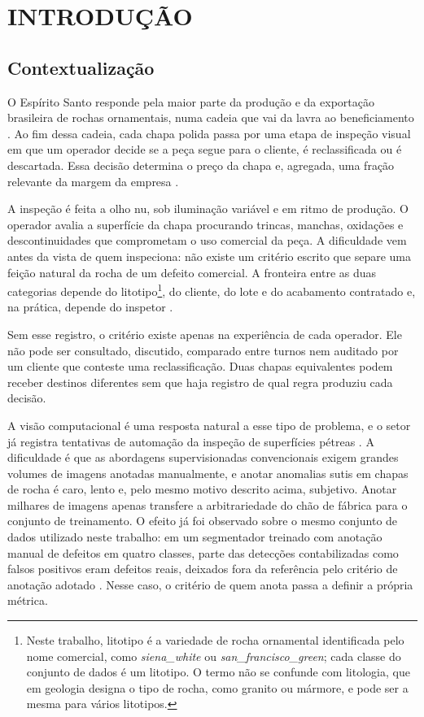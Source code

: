 \chapter[INTRODUÇÃO]{INTRODUÇÃO}

\section{Contextualização}

O Espírito Santo responde pela maior parte da produção e da exportação brasileira de rochas ornamentais, numa cadeia que vai da lavra ao beneficiamento \cite{stone_economy_bahiense2023}. Ao fim dessa cadeia, cada chapa polida passa por uma etapa de inspeção visual em que um operador decide se a peça segue para o cliente, é reclassificada ou é descartada. Essa decisão determina o preço da chapa e, agregada, uma fração relevante da margem da empresa \cite{stone_inspection_vidal2013}.

A inspeção é feita a olho nu, sob iluminação variável e em ritmo de produção. O operador avalia a superfície da chapa procurando trincas, manchas, oxidações e descontinuidades que comprometam o uso comercial da peça. A dificuldade vem antes da vista de quem inspeciona: não existe um critério escrito que separe uma feição natural da rocha de um defeito comercial. A fronteira entre as duas categorias depende do litotipo\footnote{Neste trabalho, litotipo é a variedade de rocha ornamental identificada pelo nome comercial, como \textit{siena\_white} ou \textit{san\_francisco\_green}; cada classe do conjunto de dados é um litotipo. O termo não se confunde com litologia, que em geologia designa o tipo de rocha, como granito ou mármore, e pode ser a mesma para vários litotipos.}, do cliente, do lote e do acabamento contratado e, na prática, depende do inspetor \cite{stone_subjectivity_castro2018}.

Sem esse registro, o critério existe apenas na experiência de cada operador. Ele não pode ser consultado, discutido, comparado entre turnos nem auditado por um cliente que conteste uma reclassificação. Duas chapas equivalentes podem receber destinos diferentes sem que haja registro de qual regra produziu cada decisão.

A visão computacional é uma resposta natural a esse tipo de problema, e o setor já registra tentativas de automação da inspeção de superfícies pétreas \cite{stone_tereso2020, stone_lopez2010}. A dificuldade é que as abordagens supervisionadas convencionais exigem grandes volumes de imagens anotadas manualmente, e anotar anomalias sutis em chapas de rocha é caro, lento e, pelo mesmo motivo descrito acima, subjetivo. Anotar milhares de imagens apenas transfere a arbitrariedade do chão de fábrica para o conjunto de treinamento. O efeito já foi observado sobre o mesmo conjunto de dados utilizado neste trabalho: em um segmentador treinado com anotação manual de defeitos em quatro classes, parte das detecções contabilizadas como falsos positivos eram defeitos reais, deixados fora da referência pelo critério de anotação adotado \cite{fracstoneai_oliveira2026}. Nesse caso, o critério de quem anota passa a definir a própria métrica.

